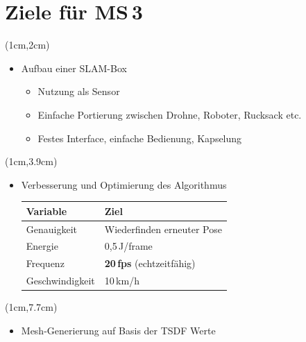 \documentclass{beamer}
\begin{document}
\section{Ziele für MS\,3}
\begin{frame}{\secname}
\begin{textblock*}{12cm}(1cm,2cm)
\begin{itemize}
\item{Aufbau einer SLAM-Box}
\begin{itemize}
\item{Nutzung als Sensor}
\item{Einfache Portierung zwischen Drohne, Roboter, Rucksack etc.}
\item{Festes Interface, einfache Bedienung, Kapselung}
\end{itemize}
\end{itemize}
\end{textblock*}
\begin{textblock*}{12cm}(1cm,3.9cm)
\begin{itemize}
\item{Verbesserung und Optimierung des Algorithmus \\
\vspace{0.2cm}
\begin{tabular}{ll}
\toprule
Variable & Ziel \\
\midrule
Genauigkeit & Wiederfinden erneuter Pose \\
Energie & 0,5\,J/frame \\
Frequenz & \textbf{20\,fps} (echtzeitfähig) \\
Geschwindigkeit & 10\,km/h \\
\bottomrule
\end{tabular}}
\end{itemize}
\end{textblock*}
\begin{textblock*}{12cm}(1cm,7.7cm)
\begin{itemize}
\item{Mesh-Generierung auf Basis der TSDF Werte}
\end{itemize}
\end{textblock*}
\end{frame}
\end{document}
